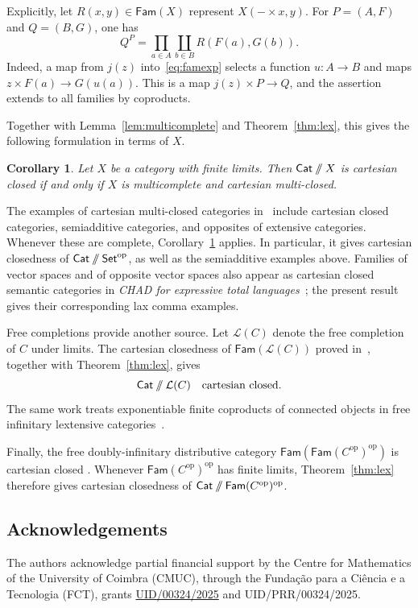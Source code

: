 \documentclass[11pt,a4paper]{amsart}
\newtheorem{corollary}[theorem]{Corollary}
\theoremstyle{definition}
\numberwithin{equation}{section}
\newcommand{\Cat}{\mathsf{Cat}}
\newcommand{\Set}{\mathsf{Set}}
\newcommand{\Fam}{\mathsf{Fam}}
\newcommand{\op}{\mathrm{op}}
\newcommand{\sslash}{\mathbin{/\mkern-6mu/}}
\newcommand{\DX}{\Cat\sslash X}
\begin{document}
Explicitly, let $R(x,y)\in\Fam(X)$ represent $X(-\times x,y)$. For $P=(A,F)$ and $Q=(B,G)$, one has
\begin{equation}\label{eq:famexp}
 Q^P=\prod_{a\in A}\coprod_{b\in B}R(F(a),G(b)).
\end{equation}
Indeed, a map from $j(z)$ into~\eqref{eq:famexp} selects a function $u:A\to B$ and maps $z\times F(a)\to G(u(a))$. This is a map $j(z)\times P\to Q$, and the assertion extends to all families by coproducts.

Together with Lemma~\ref{lem:multicomplete} and Theorem~\ref{thm:lex}, this gives the following formulation in terms of $X$.

\begin{corollary}\label{cor:intrinsic}
Let $X$ be a category with finite limits. Then $\DX$ is cartesian closed if and only if $X$ is multicomplete and cartesian multi-closed.
\end{corollary}

The examples of cartesian multi-closed categories in~\cite[Examples~2.9]{AR} include cartesian closed categories, semiadditive categories, and opposites of extensive categories. Whenever these are complete, Corollary~\ref{cor:intrinsic} applies. In particular, it gives cartesian closedness of $\Cat\sslash\Set^{\op}$, as well as the semiadditive examples above. Families of vector spaces and of opposite vector spaces also appear as cartesian closed semantic categories in \emph{CHAD for expressive total languages}~\cite[Section~10.2]{CHAD}; the present result gives their corresponding lax comma examples.

Free completions provide another source. Let $\mathcal L(C)$ denote the free completion of $C$ under limits. The cartesian closedness of $\Fam(\mathcal L(C))$ proved in~\cite[Theorem~4.4]{FED}, together with Theorem~\ref{thm:lex}, gives
\[
 \Cat\sslash\mathcal L(C)\quad\text{cartesian closed}.
\]
The same work treats exponentiable finite coproducts of connected objects in free infinitary lextensive categories~\cite[Theorem~4.7]{FED}.

Finally, the free doubly-infinitary distributive category $\Fam(\Fam(C^{\op})^{\op})$ is cartesian closed \cite[Theorem~3.11]{Dist}. Whenever $\Fam(C^{\op})^{\op}$ has finite limits, Theorem~\ref{thm:lex} therefore gives cartesian closedness of $\Cat\sslash\Fam(C^{\op})^{\op}$.

\subsection*{Acknowledgements}
The authors acknowledge partial financial support by the Centre for Mathematics of the University of Coimbra (CMUC), through the Funda\c{c}\~ao para a Ci\^encia e a Tecnologia (FCT), grants \href{https://doi.org/10.54499/UID/00324/2025}{UID/00324/2025} and UID/PRR/00324/2025.
\end{document}
